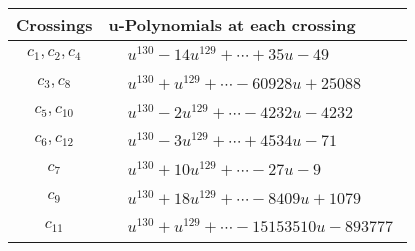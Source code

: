 \documentclass[1p]{elsarticle_modified}
\theoremstyle{definition}
\begin{document}
\begin{tabular}{m{50pt}|m{274pt}}
Crossings & \hspace{64pt}u-Polynomials at each crossing \\
\hline $$\begin{aligned}c_{1},c_{2},c_{4}\end{aligned}$$&$\begin{aligned}
&u^{130}-14 u^{129}+\cdots+35 u-49
\end{aligned}$\\
\hline $$\begin{aligned}c_{3},c_{8}\end{aligned}$$&$\begin{aligned}
&u^{130}+u^{129}+\cdots-60928 u+25088
\end{aligned}$\\
\hline $$\begin{aligned}c_{5},c_{10}\end{aligned}$$&$\begin{aligned}
&u^{130}-2 u^{129}+\cdots-4232 u-4232
\end{aligned}$\\
\hline $$\begin{aligned}c_{6},c_{12}\end{aligned}$$&$\begin{aligned}
&u^{130}-3 u^{129}+\cdots+4534 u-71
\end{aligned}$\\
\hline $$\begin{aligned}c_{7}\end{aligned}$$&$\begin{aligned}
&u^{130}+10 u^{129}+\cdots-27 u-9
\end{aligned}$\\
\hline $$\begin{aligned}c_{9}\end{aligned}$$&$\begin{aligned}
&u^{130}+18 u^{129}+\cdots-8409 u+1079
\end{aligned}$\\
\hline $$\begin{aligned}c_{11}\end{aligned}$$&$\begin{aligned}
&u^{130}+u^{129}+\cdots-15153510 u-893777
\end{aligned}$\\
\hline
\end{tabular}\\~\\
\end{document}

